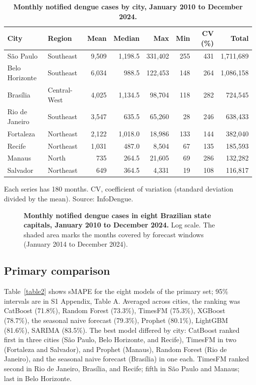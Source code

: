 \documentclass[10pt,letterpaper]{article}
\begin{document}

\begin{table}[!ht]
\centering
\small
\caption{\textbf{Monthly notified dengue cases by city, January 2010 to December 2024.}}
\begin{tabular}{llrrrrrr}
\toprule
City & Region & Mean & Median & Max & Min & CV (\%) & Total \\
\midrule
S\~ao Paulo & Southeast & 9{{,}}509 & 1{,}198.5 & 331{,}402 & 255 & 431 & 1{,}711{,}689 \\
Belo Horizonte & Southeast & 6{{,}}034 & 988.5 & 122{,}453 & 148 & 264 & 1{,}086{,}158 \\
Bras\'ilia & Central-West & 4{{,}}025 & 1{,}134.5 & 98{,}704 & 118 & 282 & 724{,}545 \\
Rio de Janeiro & Southeast & 3{{,}}547 & 635.5 & 65{,}260 & 28 & 246 & 638{,}433 \\
Fortaleza & Northeast & 2{{,}}122 & 1{,}018.0 & 18{,}986 & 133 & 144 & 382{,}040 \\
Recife & Northeast & 1{{,}}031 & 487.0 & 8{,}504 & 67 & 135 & 185{,}593 \\
Manaus & North & 735 & 264.5 & 21{,}605 & 69 & 286 & 132{,}282 \\
Salvador & Northeast & 649 & 364.5 & 4{,}331 & 19 & 108 & 116{,}817 \\
\bottomrule
\end{tabular}
\begin{flushleft} Each series has 180 months. CV, coefficient of variation (standard deviation divided by the mean). Source: InfoDengue.
\end{flushleft}
\label{table1}
\end{table}


\begin{figure}[!h]
\caption{\textbf{Monthly notified dengue cases in eight Brazilian state capitals, January 2010 to December 2024.}
Log scale. The shaded area marks the months covered by forecast windows (January 2014 to December 2024).}
\label{fig1}
\end{figure}

\subsection*{Primary comparison}
Table~\ref{table2} shows sMAPE for the eight models of the primary set; 95\% intervals are in S1 Appendix, Table A. Averaged across cities, the ranking was CatBoost (71.8\%), Random Forest (73.3\%), TimesFM (75.3\%), XGBoost (78.7\%), the seasonal naive forecast (79.3\%), Prophet (80.1\%), LightGBM (81.6\%), SARIMA (83.5\%). The best model differed by city: CatBoost ranked first in three cities (S\~ao Paulo, Belo Horizonte, and Recife), TimesFM in two (Fortaleza and Salvador), and Prophet (Manaus), Random Forest (Rio de Janeiro), and the seasonal naive forecast (Bras\'ilia) in one each. TimesFM ranked second in Rio de Janeiro, Bras\'ilia, and Recife; fifth in S\~ao Paulo and Manaus; last in Belo Horizonte.
\end{document}
